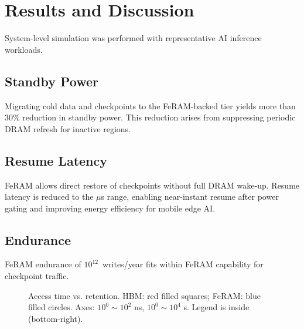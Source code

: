 \section{Results and Discussion}
System-level simulation was performed with representative AI inference workloads.

\subsection{Standby Power}
Migrating cold data and checkpoints to the FeRAM-backed tier yields more than 30\% reduction in standby power.
This reduction arises from suppressing periodic DRAM refresh for inactive regions.

\subsection{Resume Latency}
FeRAM allows direct restore of checkpoints without full DRAM wake-up.
Resume latency is reduced to the $\mu$s range, enabling near-instant resume after power gating and improving energy efficiency for mobile edge AI.

\subsection{Endurance}
FeRAM endurance of $10^{12}$~writes/year fits within FeRAM capability for checkpoint traffic.

\begin{figure}[t]
\centering
{}
\vspace{-2mm} %
\caption{Access time vs. retention. HBM: red filled squares; FeRAM: blue filled circles.
Axes: $10^0\!\sim\!10^2$ ns, $10^0\!\sim\!10^4$ s. Legend is inside (bottom-right).}
\label{fig:retention}
\end{figure}
